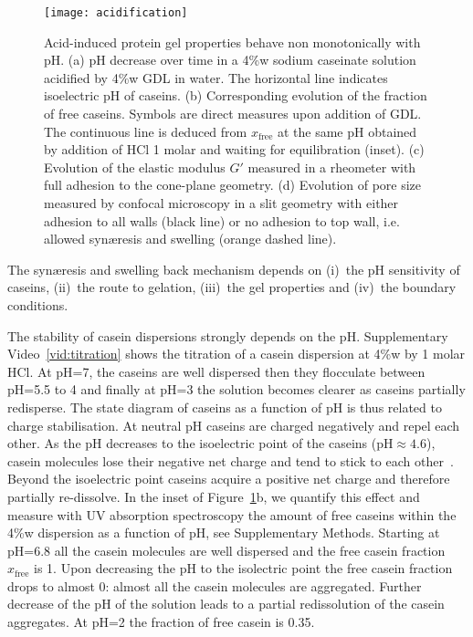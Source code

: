 \documentclass[twocolumn,superscriptaddress,showpacs,preprintnumbers,
amsmath,amssymb,prl]{revtex4-1}
\begin{document}
\begin{figure}
	\texttt{[image: acidification]}%
	\caption{Acid-induced protein gel properties behave non monotonically with pH. (a) pH decrease over time in a 4\%w sodium caseinate solution acidified by 4\%w GDL in water. The horizontal line indicates isoelectric pH of caseins. (b) Corresponding evolution of the fraction of free caseins. Symbols are direct measures upon addition of GDL. The continuous line is deduced from $x_\text{free}$ at the same pH obtained by addition of HCl 1 molar and waiting for equilibration (inset). (c) Evolution of the elastic modulus $G'$ measured in a rheometer with full adhesion to the cone-plane geometry. (d) Evolution of pore size measured by confocal microscopy in a slit geometry with either adhesion to all walls (black line) or no adhesion to top wall, i.e. allowed syn\ae{}resis and swelling (orange dashed line).}%
	\label{fig:acidification}
\end{figure}


The syn\ae{}resis and swelling back mechanism depends on (i)~the pH sensitivity of caseins, (ii)~the route to gelation, (iii)~the gel properties and (iv)~the boundary conditions.

The stability of casein dispersions strongly depends on the pH. Supplementary Video~\ref{vid:titration} shows the titration of a casein dispersion at 4\%w by 1 molar HCl. At pH=7, the caseins are well dispersed then they flocculate between pH=5.5 to 4 and finally at pH=3 the solution becomes clearer as caseins partially redisperse. The state diagram of caseins as a function of pH is thus related to charge stabilisation. At neutral pH caseins are charged negatively and repel each other. As the pH decreases to the isoelectric point of the caseins (pH$\approx 4.6$), casein molecules lose their negative net charge and tend to stick to each other~\cite{Roefs1986,Bremer1989,Lucey1998,Dickinson2002}. Beyond the isoelectric point caseins acquire a positive net charge and therefore partially re-dissolve. In the inset of Figure~\ref{fig:acidification}b, we quantify this effect and measure with UV absorption spectroscopy the amount of free caseins within the 4\%w dispersion as a function of pH, see Supplementary Methods. Starting at pH=6.8 all the casein molecules are well dispersed and the free casein fraction $x_\text{free}$ is 1. Upon decreasing the pH to the isolectric point the free casein fraction drops to almost 0: almost all the casein molecules are aggregated. Further decrease of the pH of the solution leads to a partial redissolution of the casein aggregates. At pH=2 the fraction of free casein is 0.35.
\end{document}
